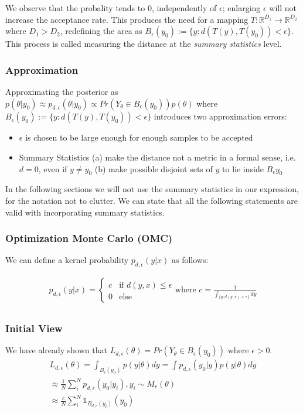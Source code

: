 \documentclass[11pt,twoside]{article}
\numberwithin{Theorem}{section}
\numberwithin{Definition}{section}
\numberwithin{Lemma}{section}
\numberwithin{Algorithm}{section}
\numberwithin{equation}{section}
\begin{document}
We observe that the probality tends to $0$, independently of $\epsilon$; enlarging $\epsilon$ will not increase the acceptance rate. This produces the need for a mapping $T: \mathbb{R}^{D_1} \rightarrow \mathbb{R}^{D_2}$ where $D_1 > D_2$, redefining the area as $B_\epsilon(y_0) := \{y: d(T(y), T(y_0)) < \epsilon \}$. This process is called measuring the distance at the \textit{summary statistics} level.

\subsubsection{Approximation}

Approximating the posterior as $p(\theta|y_0) \approx p_{d,\epsilon}(\theta|y_0) \propto Pr(Y_\theta \in B_\epsilon(y_0))p(\theta)$ where $B_\epsilon(y_0) := \{y: d(T(y), T(y_0)) < \epsilon \}$ introduces two approximation errors:

\begin{itemize}
\item $\epsilon$ is chosen to be large enough for enough samples to be accepted
  \item Summary Statistics (a) make the distance not a metric in a formal sense, i.e. $d = 0$, even if $y \neq y_0$ (b) make possible disjoint sets of $y$ to lie inside $B_\epsilon{y_0}$
  \end{itemize}

  In the following sections we will not use the summary statistics in our expression, for the notation not to clutter. We can state that all the following statements are valid with incorporating summary statistics.
  
\subsubsection{Optimization Monte Carlo (OMC)}
We can define a kernel probability $p_{d,\epsilon}(y|x)$ as follows:

\begin{gather}
  p_{d,\epsilon}(y|x) = \left\{
	\begin{array}{ll}
		c  & \mbox{if } d(y,x) \leq \epsilon \\
		0 & \mbox{else } 
	\end{array}
  \right. \text{where } c = \frac{1}{\int_{ \{ y: d(y,x) < \epsilon\}} dy} \\
\end{gather}

\subsubsection*{Initial View}
We have already shown that $L_{d,\epsilon}(\theta) = Pr(Y_\theta \in B_\epsilon(y_0))$ where $\epsilon > 0$. 
\begin{gather} \label{eq:primal_view}
  L_{d, \epsilon}(\theta)=\int_{B_\epsilon(y_0)}p(y|\theta)dy = \int p_{d,\epsilon}(y_0|y)p(y|\theta)dy\\
  \approx \frac{1}{N} \sum_i^N p_{d,\epsilon} (y_0|y_i), y_i \sim M_r(\theta) \\
  \approx \frac{c}{N} \sum_i^N \mathbb{1}_{B_{d,\epsilon}(y_i)} (y_0)
\end{gather}
\end{document}
